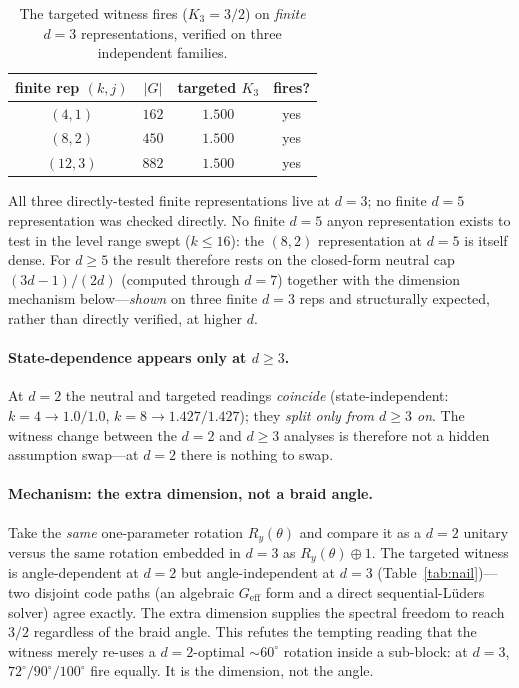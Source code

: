 \documentclass[aps,prx,reprint,amsmath,amssymb,floatfix,nofootinbib,superscriptaddress]{revtex4-2}
\begin{document}
\begin{table}[b]
\caption{The targeted witness fires ($K_3 = 3/2$) on \emph{finite} $d=3$
representations, verified on three independent families.}
\label{tab:finite}
\centering
\begin{tabular}{c c c c}
\toprule
finite rep $(k,j)$ & $|G|$ & targeted $K_3$ & fires? \\
\midrule
$(4,1)$  & $162$ & $1.500$ & yes \\
$(8,2)$  & $450$ & $1.500$ & yes \\
$(12,3)$ & $882$ & $1.500$ & yes \\
\bottomrule
\end{tabular}
\end{table}

All three directly-tested finite representations live at $d=3$; no finite $d=5$
representation was checked directly. No finite $d=5$ anyon representation exists to
test in the level range swept ($k \le 16$): the $(8,2)$ representation at $d=5$ is
itself dense. For $d \ge 5$ the result therefore rests on the closed-form neutral
cap $(3d-1)/(2d)$ (computed through $d=7$) together with the dimension mechanism
below---\emph{shown} on three finite $d=3$ reps and structurally expected, rather
than directly verified, at higher $d$.

\paragraph{State-dependence appears only at $d \ge 3$.}
At $d=2$ the neutral and targeted readings \emph{coincide} (state-independent:
$k=4 \to 1.0/1.0$, $k=8 \to 1.427/1.427$); they \emph{split only from $d \ge 3$ on}.
The witness change between the $d=2$ and $d \ge 3$ analyses is therefore not a hidden
assumption swap---at $d=2$ there is nothing to swap.

\paragraph{Mechanism: the extra dimension, not a braid angle.}
Take the \emph{same} one-parameter rotation $R_y(\theta)$ and compare it as a $d=2$
unitary versus the same rotation embedded in $d=3$ as $R_y(\theta) \oplus 1$. The
targeted witness is angle-dependent at $d=2$ but angle-independent at $d=3$
(Table~\ref{tab:nail})---two disjoint code paths (an algebraic $G_{\mathrm{eff}}$ form
and a direct sequential-L\"uders solver) agree exactly. The extra dimension supplies
the spectral freedom to reach $3/2$ regardless of the braid angle. This refutes the
tempting reading that the witness merely re-uses a $d=2$-optimal $\sim 60^\circ$
rotation inside a sub-block: at $d=3$, $72^\circ/90^\circ/100^\circ$ fire equally. It
is the dimension, not the angle.
\end{document}
